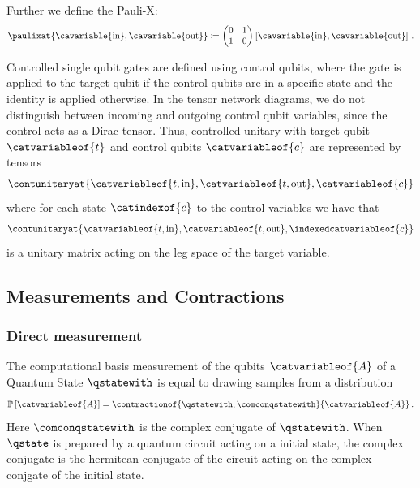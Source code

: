 Further we define the Pauli-X:
\begin{align*}
    \paulixat{\cavariable{\insymbol},\cavariable{\outsymbol}} \coloneqq
    \coloredmatrixof{
        0 & 1 \\
        1 & 0}{\cavariable{\insymbol},\cavariable{\outsymbol}} \, .
\end{align*}

Controlled single qubit gates are defined using control qubits, where the gate is applied to the target qubit if the control qubits are in a specific state and the identity is applied otherwise.
In the tensor network diagrams, we do not distinguish between incoming and outgoing control qubit variables, since the control acts as a Dirac tensor.
Thus, controlled unitary with target qubit $\catvariableof{t}$ and control qubits $\catvariableof{c}$ are represented by tensors
\begin{align*}
    \contunitaryat{\catvariableof{t,\insymbol},\catvariableof{t,\outsymbol},\catvariableof{c}}
\end{align*}
where for each state $\catindexof{c}$ to the control variables we have that
\begin{align*}
    \contunitaryat{\catvariableof{t,\insymbol},\catvariableof{t,\outsymbol},\indexedcatvariableof{c}}
\end{align*}
is a unitary matrix acting on the leg space of the target variable.

\subsection{Measurements and Contractions}

\subsubsection{Direct measurement}

The computational basis measurement of the qubits $\catvariableof{\variableset}$ of a Quantum State $\qstatewith$ is equal to drawing samples from a distribution
\begin{align*}
    \probat{\catvariableof{\variableset}} = \contractionof{
        \qstatewith, \comconqstatewith
    }{\catvariableof{\variableset}} \, .
\end{align*}
Here $\comconqstatewith$ is the complex conjugate of $\qstatewith$.
When $\qstate$ is prepared by a quantum circuit acting on a initial state, the complex conjugate is the hermitean conjugate of the circuit acting on the complex conjgate of the initial state.

